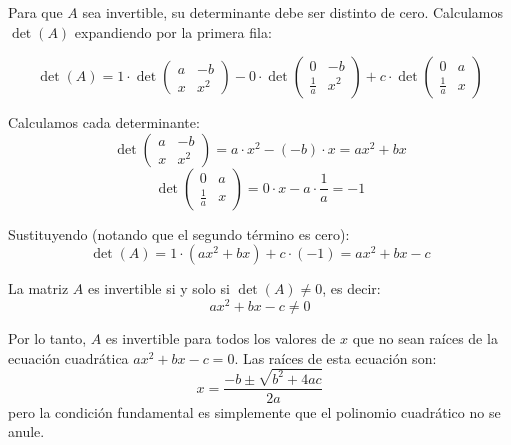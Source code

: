 \begin{myproof}
Para que $A$ sea invertible, su determinante debe ser distinto de cero. Calculamos $\det(A)$ expandiendo por la primera fila:

\[
\det(A) = 1 \cdot \det \begin{pmatrix} a & -b \\ x & x^2 \end{pmatrix} 
- 0 \cdot \det \begin{pmatrix} 0 & -b \\ \frac{1}{a} & x^2 \end{pmatrix} 
+ c \cdot \det \begin{pmatrix} 0 & a \\ \frac{1}{a} & x \end{pmatrix}
\]

Calculamos cada determinante:
\[
\det \begin{pmatrix} a & -b \\ x & x^2 \end{pmatrix} = a \cdot x^2 - (-b) \cdot x = a x^2 + b x
\]
\[
\det \begin{pmatrix} 0 & a \\ \frac{1}{a} & x \end{pmatrix} = 0 \cdot x - a \cdot \frac{1}{a} = -1
\]

Sustituyendo (notando que el segundo término es cero):
\[
\det(A) = 1 \cdot (a x^2 + b x) + c \cdot (-1) = a x^2 + b x - c
\]

La matriz $A$ es invertible si y solo si $\det(A) \neq 0$, es decir:
\[
a x^2 + b x - c \neq 0
\]

Por lo tanto, $A$ es invertible para todos los valores de $x$ que no sean raíces de la ecuación cuadrática $a x^2 + b x - c = 0$. Las raíces de esta ecuación son:
\[
x = \frac{-b \pm \sqrt{b^2 + 4ac}}{2a}
\]
pero la condición fundamental es simplemente que el polinomio cuadrático no se anule.

\end{myproof}



